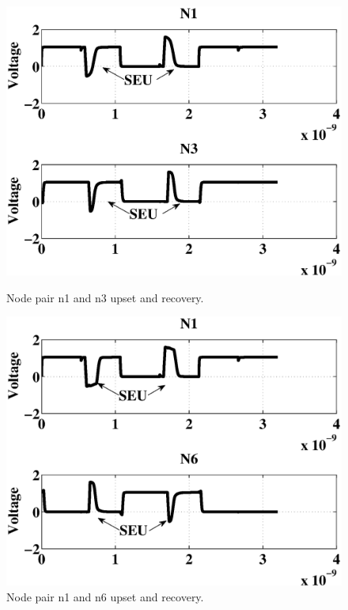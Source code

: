 \begin{figure}[!htbp]
	\centering
	\parbox{4cm}{
		\includegraphics[width=\linewidth]{Figures/WavePlots/n1n3.eps}
		\caption{Node pair n1 and n3 upset and recovery.}
		\label{fig:n1n3}}
	\qquad
	\begin{minipage}{4cm}
		\includegraphics[width=\linewidth]{Figures/WavePlots/n1n6.eps}
		\caption{Node pair n1 and n6 upset and recovery.}
		\label{fig:n1n6}
	\end{minipage}
\end{figure}

